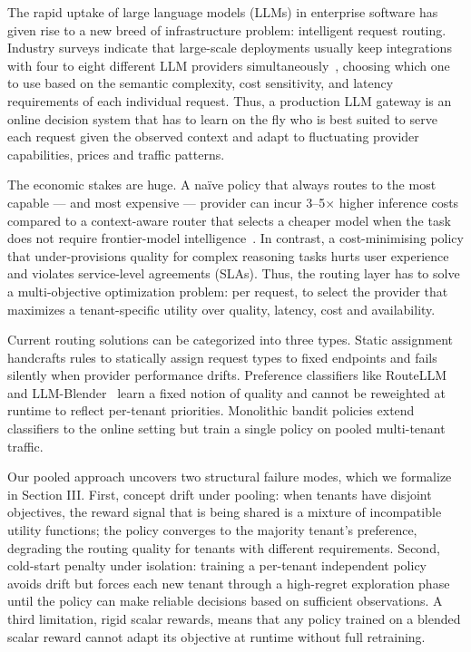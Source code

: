 \documentclass[conference]{IEEEtran}
\begin{document}
The rapid uptake of large language models (LLMs) in enterprise software has given rise to a new breed of infrastructure problem: intelligent request routing. Industry surveys indicate that large-scale deployments usually keep integrations with four to eight different LLM providers simultaneously~\cite{ong2024routellm}, choosing which one to use based on the semantic complexity, cost sensitivity, and latency requirements of each individual request. Thus, a production LLM gateway is an online decision system that has to learn on the fly who is best suited to serve each request given the observed context and adapt to fluctuating provider capabilities, prices and traffic patterns.

The economic stakes are huge. A na\"ive policy that always routes to the most capable --- and most expensive --- provider can incur 3--5$\times$ higher inference costs compared to a context-aware router that selects a cheaper model when the task does not require frontier-model intelligence~\cite{ding2024hybridllm}. In contrast, a cost-minimising policy that under-provisions quality for complex reasoning tasks hurts user experience and violates service-level agreements (SLAs). Thus, the routing layer has to solve a multi-objective optimization problem: per request, to select the provider that maximizes a tenant-specific utility over quality, latency, cost and availability.

Current routing solutions can be categorized into three types. Static assignment handcrafts rules to statically assign request types to fixed endpoints and fails silently when provider performance drifts. Preference classifiers like RouteLLM~\cite{ong2024routellm} and LLM-Blender~\cite{jiang2023llmblender} learn a fixed notion of quality and cannot be reweighted at runtime to reflect per-tenant priorities. Monolithic bandit policies extend classifiers to the online setting but train a single policy on pooled multi-tenant traffic.

Our pooled approach uncovers two structural failure modes, which we formalize in Section III. First, concept drift under pooling: when tenants have disjoint objectives, the reward signal that is being shared is a mixture of incompatible utility functions; the policy converges to the majority tenant's preference, degrading the routing quality for tenants with different requirements. Second, cold-start penalty under isolation: training a per-tenant independent policy avoids drift but forces each new tenant through a high-regret exploration phase until the policy can make reliable decisions based on sufficient observations. A third limitation, rigid scalar rewards, means that any policy trained on a blended scalar reward cannot adapt its objective at runtime without full retraining.
\end{document}

